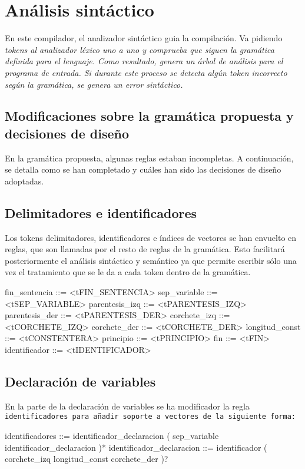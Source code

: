 \section{Análisis sintáctico}
En este compilador, el analizador sintáctico guia la compilación. Va pidiendo \it{tokens} al analizador léxico uno a uno y comprueba que siguen la gramática definida para el lenguaje. Como resultado, genera un árbol de análisis para el programa de entrada. Si durante este proceso se detecta algún token incorrecto según la gramática, se genera un error sintáctico.

\subsection{Modificaciones sobre la gramática propuesta y decisiones de diseño}
En la gramática propuesta, algunas reglas estaban incompletas.
A continuación, se detalla como se han completado y cuáles han sido las decisiones de diseño adoptadas.

\subsection{Delimitadores e identificadores}
Los tokens delimitadores, identificadores e índices de vectores se han envuelto en reglas, que son llamadas por el resto de reglas de la gramática. Esto facilitará posteriormente el análisis sintáctico y semántico ya que permite escribir sólo una vez el tratamiento que se le da a cada token dentro de la gramática.

\begin{codigo}
fin_sentencia ::= <tFIN_SENTENCIA>
sep_variable ::= <tSEP_VARIABLE>
parentesis_izq ::= <tPARENTESIS_IZQ>
parentesis_der ::= <tPARENTESIS_DER>
corchete_izq ::= <tCORCHETE_IZQ>
corchete_der ::= <tCORCHETE_DER>
longitud_const ::= <tCONSTENTERA>
principio ::= <tPRINCIPIO>
fin ::= <tFIN>
identificador ::= <tIDENTIFICADOR>
\end{codigo}

\subsection{Declaración de variables}
En la parte de la declaración de variables se ha modificador la regla \tt{identificadores} para añadir soporte a vectores de la siguiente forma:

\begin{codigo}
identificadores ::= identificador_declaracion ( sep_variable identificador_declaracion )*
identificador_declaracion ::= identificador ( corchete_izq longitud_const corchete_der )?
\end{codigo}

